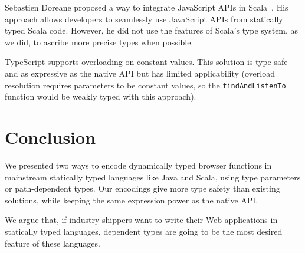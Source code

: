 \documentclass{llncs}
\newcommand{\jscode}[1]{\lstinline[language=JavaScript]|#1|}
\begin{document}
Sebastien Doreane proposed a way to integrate JavaScript APIs in Scala~\cite{Doeraene13_ScalaJs}. His approach allows developers to seamlessly use JavaScript APIs from statically typed Scala code. However, he did not use the features of Scala's type system, as we did, to ascribe more precise types when possible.

TypeScript supports overloading on constant values. This solution is type safe and as expressive as the native API but has limited applicability (overload resolution requires parameters to be constant values, so the \jscode{findAndListenTo} function would be weakly typed with this approach).

\section{Conclusion}
\label{sec-conclusion}

We presented two ways to encode dynamically typed browser functions in mainstream statically typed languages like Java and Scala, using type parameters or path-dependent types. Our encodings give more type safety than existing solutions, while keeping the same expression power as the native API.

We argue that, if industry shippers want to write their Web applications in statically typed languages, dependent types are going to be the most desired feature of these languages.



\end{document}
